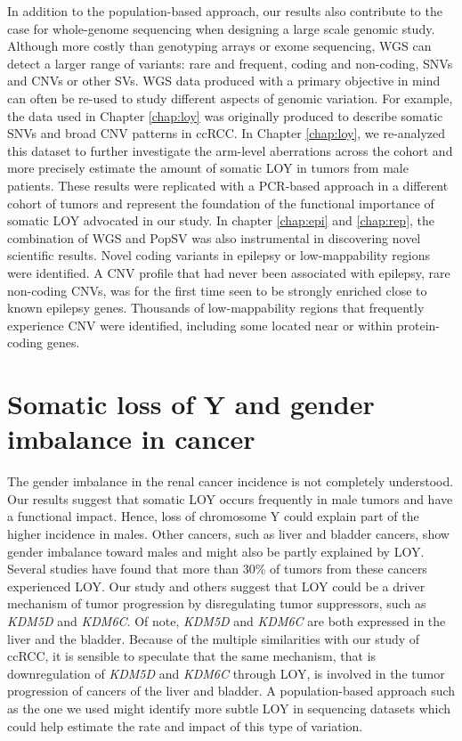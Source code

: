 In addition to the population-based approach, our results also contribute to the case for whole-genome sequencing when designing a large scale genomic study.
Although more costly than genotyping arrays or exome sequencing, WGS can detect a larger range of variants: rare and frequent, coding and non-coding, SNVs and CNVs or other SVs.
WGS data produced with a primary objective in mind can often be re-used to study different aspects of genomic variation.
For example, the data used in Chapter \ref{chap:loy} was originally produced to describe somatic SNVs and broad CNV patterns in ccRCC\cite{Scelo2014}.
In Chapter \ref{chap:loy}, we re-analyzed this dataset to further investigate the arm-level aberrations across the cohort and more precisely estimate the amount of somatic LOY in tumors from male patients.
These results were replicated with a PCR-based approach in a different cohort of tumors and represent the foundation of the functional importance of somatic LOY advocated in our study.
In chapter \ref{chap:epi} and \ref{chap:rep}, the combination of WGS and {\sf PopSV} was also instrumental in discovering novel scientific results.
Novel coding variants in epilepsy or low-mappability regions were identified.
A CNV profile that had never been associated with epilepsy, rare non-coding CNVs, was for the first time seen to be strongly enriched close to known epilepsy genes.
Thousands of low-mappability regions that frequently experience CNV were identified, including some located near or within protein-coding genes.

\section*{Somatic loss of Y and gender imbalance in cancer}

The gender imbalance in the renal cancer incidence is not completely understood.
Our results suggest that somatic LOY occurs frequently in male tumors and have a functional impact.
Hence, loss of chromosome Y could explain part of the higher incidence in males.
Other cancers, such as liver and bladder cancers, show gender imbalance toward males and might also be partly explained by LOY\cite{Siegel2017}.
Several studies have found that more than 30\% of tumors from these cancers experienced LOY\cite{Sauter1995,Park2006}.
Our study and others suggest that LOY could be a driver mechanism of tumor progression by disregulating tumor suppressors, such as {\it KDM5D} and {\it KDM6C}.
Of note, {\it KDM5D} and {\it KDM6C} are both expressed in the liver and the bladder.
Because of the multiple similarities with our study of ccRCC, it is sensible to speculate that the same mechanism, that is downregulation of {\it KDM5D} and {\it KDM6C} through LOY, is involved in the tumor progression of cancers of the liver and bladder.
A population-based approach such as the one we used might identify more subtle LOY in sequencing datasets which could help estimate the rate and impact of this type of variation.

